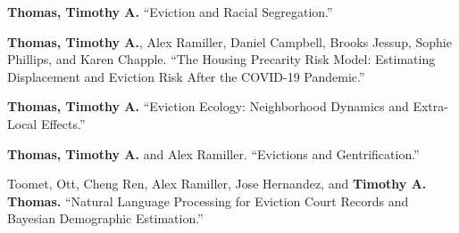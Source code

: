 



\begin{cvparagraph}


\textbf{Thomas, Timothy A.} “Eviction and Racial Segregation.”

\end{cvparagraph}

\begin{cvparagraph}


\textbf{Thomas, Timothy A.}, Alex Ramiller, Daniel Campbell, Brooks Jessup, Sophie Phillips, and Karen Chapple. “The Housing Precarity Risk Model: Estimating Displacement and Eviction Risk After the COVID-19 Pandemic.”

\end{cvparagraph}

\begin{cvparagraph}


\textbf{Thomas, Timothy A.} “Eviction Ecology: Neighborhood Dynamics and Extra-Local Effects.”

\end{cvparagraph}

\begin{cvparagraph}

\textbf{Thomas, Timothy A.} and Alex Ramiller. “Evictions and Gentrification.”
\end{cvparagraph}

\begin{cvparagraph}

Toomet, Ott, Cheng Ren, Alex Ramiller, Jose Hernandez, and \textbf{Timothy A. Thomas.} “Natural Language Processing for Eviction Court Records and Bayesian Demographic Estimation.”
\end{cvparagraph}

